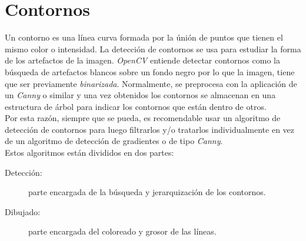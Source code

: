 \section{Contornos}\label{tecnica:contornos}
Un contorno es una línea curva formada por la únión de puntos que
tienen el mismo color o intensidad. La detección de contornos
\emph{\citep*[Contours in OpenCV]{opencv_tutorial-bib}}
\emph{\citep*[5.1 Edge Tracking]{toennies2012guide}}se usa para
estudiar la forma de los artefactos de la imagen. \emph{OpenCV}
entiende detectar contornos como la búsqueda de artefactos blancos
sobre un fondo negro por lo que la imagen, tiene que ser previamente
\emph{binarizada}. Normalmente, se preprocesa con la aplicación de un
\emph{Canny} o similar y una vez obtenidos los contornos se almacenan
en una estructura de árbol para indicar los contornos que están dentro
de otros. \\
Por esta razón, siempre que se pueda, es recomendable usar un
algoritmo de detección de contornos para luego filtrarlos y/o
tratarlos individualmente en vez de un algoritmo de detección de
gradientes o de tipo \emph{Canny}.\\
Estos algoritmos están divididos en dos partes:
\begin{description}
\item[Detección:] parte encargada de la búsqueda y jerarquización de
  los contornos.
\item[Dibujado:] parte encargada del coloreado y grosor de las líneas.
\end{description}

